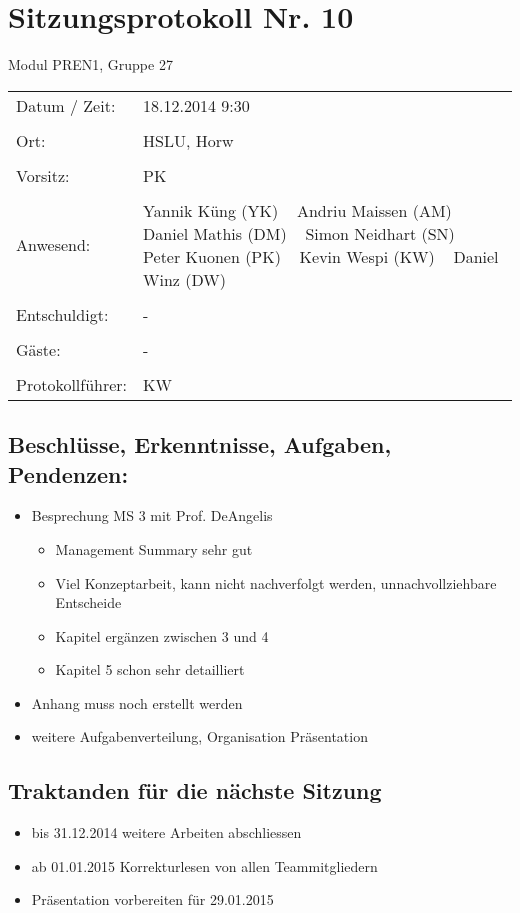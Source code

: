 \documentclass[a4paper,10pt,fleqn]{article}
\begin{document}
\section*{Sitzungsprotokoll Nr. 10}
Modul PREN1, Gruppe 27

\begin{longtable}[l]{@{}p{}@{}p{}@{}}
    Datum / Zeit: &
        18.12.2014 9:30
        \\\\
    Ort: &
        HSLU, Horw
        \\\\
    Vorsitz: &
        PK
        \\\\
    Anwesend: &
        Yannik Küng (YK) ~
        Andriu Maissen (AM) ~
        Daniel Mathis (DM) ~
        Simon Neidhart (SN) ~
        Peter Kuonen (PK) ~
        Kevin Wespi (KW) ~
        Daniel Winz (DW) ~
        \\\\
    Entschuldigt: &
        - ~
        \\\\
    Gäste: &
        - ~
        \\\\
    Protokollführer: &
        KW
        \\
\end{longtable}
%
\subsection*{Beschlüsse, Erkenntnisse, Aufgaben, Pendenzen:}
\begin{itemize}
    \item Besprechung MS 3 mit Prof. DeAngelis
    \begin{itemize}
    	\item Management Summary sehr gut
    	\item Viel Konzeptarbeit, kann nicht nachverfolgt werden, unnachvollziehbare Entscheide
    	\item Kapitel ergänzen zwischen 3 und 4
    	\item Kapitel 5 schon sehr detailliert
    \end{itemize}
    \item Anhang muss noch erstellt werden
    \item weitere Aufgabenverteilung, Organisation Präsentation
\end{itemize}
%
\subsection*{Traktanden für die nächste Sitzung}
\begin{itemize}
    \item bis 31.12.2014 weitere Arbeiten abschliessen
    \item ab 01.01.2015 Korrekturlesen von allen Teammitgliedern
    \item Präsentation vorbereiten für 29.01.2015
\end{itemize}
%
\end{document}
